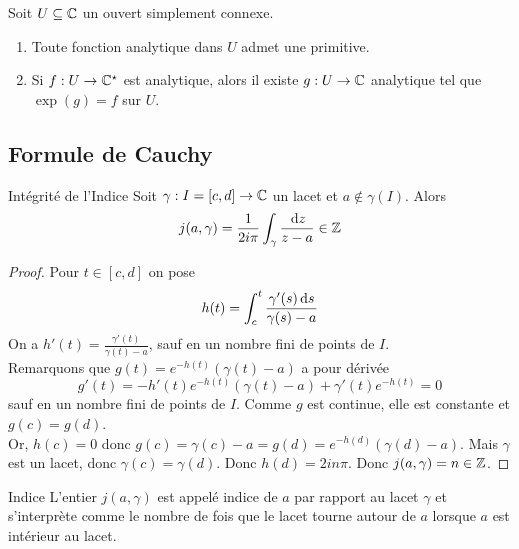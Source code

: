 \documentclass{cours}
\begin{document}
\begin{théorème}{}{}
    Soit $U \subseteq \mathbb{C}$ un ouvert simplement connexe. 
    \begin{enumerate}
        \item Toute fonction analytique dans $U$ admet une primitive.
        \item Si $f : U \to \mathbb{C}^{\star}$ est analytique, alors il existe $g : U \to \mathbb{C}$ analytique tel que $\exp(g) = f$ sur $U$. 
    \end{enumerate}
\end{théorème}

\subsection{Formule de Cauchy}
\begin{lemme}{Intégrité de l'Indice}{}
    Soit $\gamma : I = [c, d] \to \mathbb{C}$ un lacet et $a\notin \gamma(I)$. Alors
    \[
        j(a, \gamma) = \frac{1}{2i\pi}\int_{\gamma}\frac{{\rm \, d} z}{z - a} \in \mathbb{Z}
    \]
\end{lemme}
\begin{proof}
    Pour $t \in [c, d]$ on pose 
    \[
        h(t) = \int_{c}^{t}\frac{\gamma'(s){\rm \, d} s}{\gamma(s) - a}
    \]
    On a $h'(t) = \frac{\gamma'(t)}{\gamma(t)-a}$, sauf en un nombre fini de points de $I$. \\
    Remarquons que $g(t) = e^{-h(t)}\left(\gamma(t) - a\right)$ a pour dérivée
    \[
        g'(t)= - h'(t)e^{-h(t)}\left(\gamma(t)- a\right) + \gamma'(t)e^{-h(t)} = 0
    \]
    sauf en un nombre fini de points de $I$. Comme $g$ est continue, elle est constante et $g(c) = g(d)$. \\
    Or, $h(c) = 0$ donc $g(c) = \gamma(c) - a = g(d) = e^{-h(d)}(\gamma(d) - a)$. Mais $\gamma$ est un lacet, donc $\gamma(c) = \gamma(d)$. Donc $h(d) = 2in\pi$. Donc $j(a, \gamma) = n \in \mathbb{Z}$. 
\end{proof}
\begin{définition}{Indice}{}
    L'entier $j(a, \gamma)$ est appelé indice de $a$ par rapport au lacet $\gamma$ et s'interprète comme le nombre de fois que le lacet tourne autour de $a$ lorsque $a$ est intérieur au lacet.
\end{définition}
\end{document}
